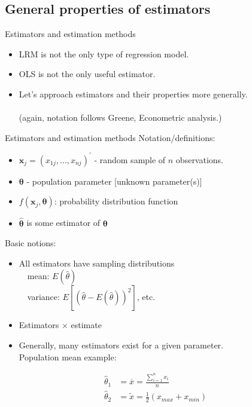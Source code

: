 \documentclass{beamer}
\begin{document}
\subsection{General properties of estimators}
\begin{frame}{Estimators and estimation methods}
\begin{itemize}
    \item LRM is not the only type of regression model.
    \bigskip
    \item OLS is not the only useful estimator.
    \bigskip
    \item Let's approach estimators and their properties more generally.\\~\\
    (again, notation follows Greene, Econometric analysis.)
\end{itemize}
\end{frame}
\begin{frame}{Estimators and estimation methods}
Notation/definitions:
\begin{itemize}
\item $\bm{x}_j = (x_{1j},\dots,x_{nj})^{\prime}$ - random sample of $n$ observations.
\item $\bm{\theta}$ - population parameter [unknown parameter(s)]
\item $f(\bm{x}_j,\bm{\theta})$: probability distribution function
\item $\hat{\bm{\theta}}$ is some estimator of $\bm{\theta}$
\end{itemize}
\medskip
Basic notions: 
\begin{itemize}
\item All estimators have sampling distributions\\
~~mean: $E(\hat{\theta})$\\
~~variance: $E[(\hat{\theta}-E(\hat{\theta}))^2]$, etc.\\
\item Estimators $\times$ estimate 
\item Generally, many estimators exist for a given parameter. \\Population mean example:
\end{itemize}
\begin{align*}
\hat{\theta}_1 & = \overline{x} = \frac{\sum_{i=1}^nx_i}{n}\\
\hat{\theta}_2 & = \tilde{x} = \frac{1}{2}(x_{max} +x_{min})
\end{align*}
\end{frame}
\end{document}
